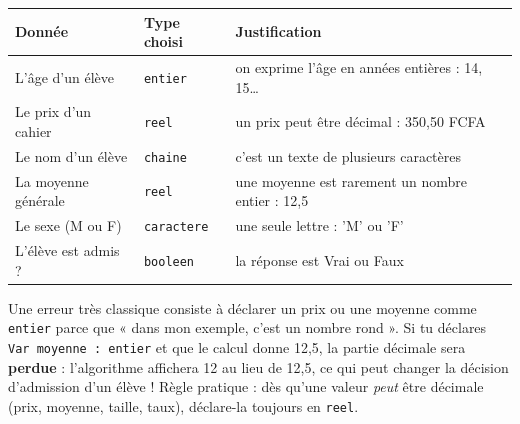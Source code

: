 \documentclass[11pt]{article}
\begin{document}
\begin{center}
\begin{tabularx}{\linewidth}{|X|l|X|}
\hline
\rowcolor{popblueL} \textbf{Donnée} & \textbf{Type choisi} & \textbf{Justification} \\
\hline
L'âge d'un élève & \texttt{entier} & on exprime l'âge en années entières : 14, 15\ldots \\
\hline
Le prix d'un cahier & \texttt{reel} & un prix peut être décimal : 350,50 FCFA \\
\hline
Le nom d'un élève & \texttt{chaine} & c'est un texte de plusieurs caractères \\
\hline
La moyenne générale & \texttt{reel} & une moyenne est rarement un nombre entier : 12,5 \\
\hline
Le sexe (M ou F) & \texttt{caractere} & une seule lettre : 'M' ou 'F' \\
\hline
L'élève est admis ? & \texttt{booleen} & la réponse est Vrai ou Faux \\
\hline
\end{tabularx}
\end{center}

\begin{attention}
Une erreur très classique consiste à déclarer un prix ou une moyenne comme \texttt{entier} parce que « dans mon exemple, c'est un nombre rond ». Si tu déclares \texttt{Var moyenne : entier} et que le calcul donne 12,5, la partie décimale sera \textbf{perdue} : l'algorithme affichera 12 au lieu de 12,5, ce qui peut changer la décision d'admission d'un élève ! Règle pratique : dès qu'une valeur \emph{peut} être décimale (prix, moyenne, taille, taux), déclare-la toujours en \texttt{reel}.
\end{attention}
\end{document}
